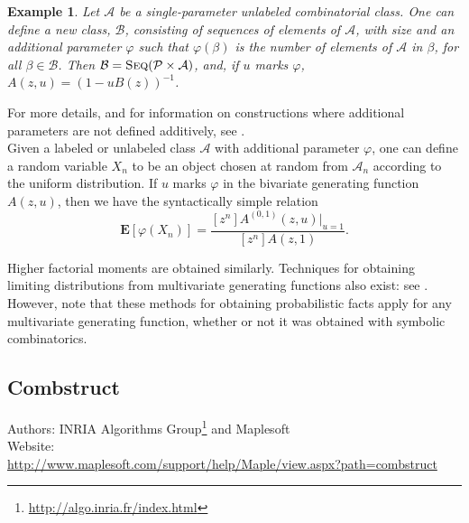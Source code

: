 \documentclass[12pt]{article}
\theoremstyle{plain}
\newtheorem{exa}{Example}
\begin{document}
\begin{exa}
	Let \( \mathcal{A} \) be a single-parameter unlabeled combinatorial class.
	One can define a new class, \( \mathcal{B} \), consisting of sequences of elements of \( \mathcal{A} \), with size and an additional parameter \( \varphi \) such that \( \varphi( \beta ) \) is the number of elements of \( \mathcal{A} \) in \( \beta \), for all \( \beta \in \mathcal{B} \).
	Then \( \mathcal{B} = \textsc{Seq}(\mathcal{P} \times \mathcal{A} ) \), and, if \(u\) marks \( \varphi \), \( A(z,u) = ( 1 - u B(z) )^{-1} \).
\end{exa}

For more details, and for information on constructions where additional parameters are not defined additively, see \cite{ac}.
\\

Given a labeled or unlabeled class \( \mathcal{A} \) with additional parameter \( \varphi \), one can define a random variable \( X_n \) to be an object chosen at random from \( \mathcal{A}_n \) according to the uniform distribution.
If \( u \) marks \( \varphi \) in the bivariate generating function \(A(z, u) \), then we have the syntactically simple relation
\[
	\mathbf{E}[\varphi(X_n)] = \frac{[z^n] A^{(0,1)}(z,u)|_{u=1}}{[z^n] A(z,1)}.
\]

Higher factorial moments are obtained similarly.
Techniques for obtaining limiting distributions from multivariate generating functions also exist: see \cite{ac}.
However, note that these methods for obtaining probabilistic facts apply for any multivariate generating function, whether or not it was obtained with symbolic combinatorics.




\subsection{Combstruct}
\label{sec:combstruct}

Authors: INRIA Algorithms Group\footnote{
 \url{http://algo.inria.fr/index.html}
} and Maplesoft
\\
Website:\\
\indent \url{http://www.maplesoft.com/support/help/Maple/view.aspx?path=combstruct}
\\
\end{document}
